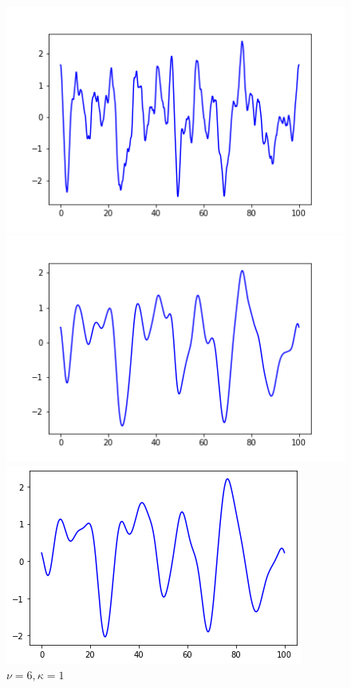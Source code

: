 \documentclass{article}
\begin{document}
\begin{figure}[H]
\begin{minipage}[t]{0.3\textwidth}  %
    \centering
    \includegraphics[width=\textwidth]{./pics/1D_RF_4096_100.0_2_1.png}  %
    \caption*{$\nu = 2, \kappa = 1$}
  \end{minipage}
  \begin{minipage}[t]{0.3\textwidth} 
    \centering
    \includegraphics[width=\textwidth]{./pics/1D_RF_4096_100.0_6_1.png} 
    \caption*{$\nu = 6, \kappa = 1$}
  \end{minipage}
  \begin{minipage}[t]{0.3\textwidth}
    \centering
    \includegraphics[width=\textwidth]{./pics/1D_RF_4096_100.0_10_1.png}  %

\end{minipage}
\end{figure}
\end{document}
